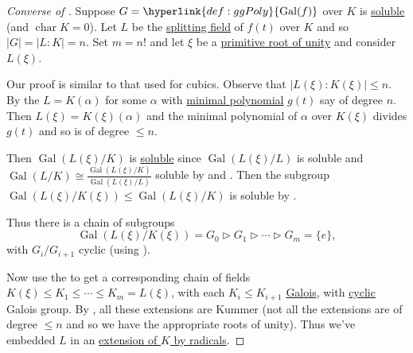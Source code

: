 \documentclass{article}
\DeclareMathOperator{\chara}{char}
\DeclareMathOperator{\Gal}{Gal}
\begin{document}
\begin{proof}[Converse of ]
    Suppose $G = \hyperlink{def:ggPoly}{\Gal(f)}$ over $K$ is \hyperlink{def:soluble}{soluble} (and $\chara K=0$).
    Let $L$ be the \hyperlink{def:splitting}{splitting field} of $f(t)$ over $K$ and so $|G| = |L:K| = n$.
    Set $m = n!$ and let $\xi$ be a \hyperlink{def:primRoot}{primitive root of unity} and consider $L(\xi)$.
    \begin{center}
    \end{center}
    Our proof is similar to that used for cubics.
    Observe that $|L(\xi):K(\xi)| \leq n$. By the  $L=K(\alpha)$ for some $\alpha$ with \hyperlink{def:minimalPoly}{minimal polynomial} $g(t)$ say of degree $n$.
    Then $L(\xi) = K(\xi)(\alpha)$ and the minimal polynomial of $\alpha$ over $K(\xi)$ divides $g(t)$ and so is of degree $\leq n$.

    Then $\Gal(L(\xi)/K)$ is \hyperlink{def:soluble}{soluble} since $\Gal(L(\xi)/L)$ is soluble and $\Gal(L/K) \cong \frac{\Gal(L(\xi)/K)}{\Gal(L(\xi)/L)}$ soluble by  and .
    Then the subgroup $\Gal(L(\xi)/K(\xi)) \leq \Gal(L(\xi)/K)$ is soluble by .

    Thus there is a chain of subgroups
    \begin{equation*}
        \Gal(L(\xi)/K(\xi)) = G_0 \rhd G_1 \rhd \dotsb \rhd G_m = \{e\},
    \end{equation*}
    with $G_i/G_{i+1}$ cyclic (using ).

    Now use the  to get a corresponding chain of fields $K(\xi) \leq K_1 \leq \dotsb \leq K_m = L(\xi)$, with each $K_i \leq K_{i+1}$ \hyperlink{def:galoisExt}{Galois}, with \hyperlink{def:cyclic}{cyclic} Galois group.
    By , all these extensions are Kummer (not all the extensions are of degree $\leq n$ and so we have the appropriate roots of unity).
    Thus we've embedded $L$ in an \hyperlink{def:radicals}{extension of $K$ by radicals}.
\end{proof}
\end{document}

